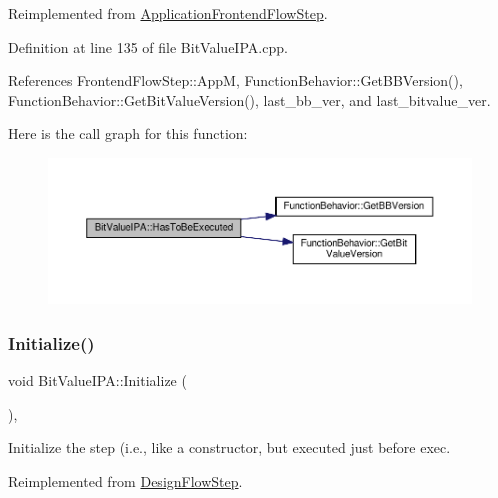 Reimplemented from \hyperlink{classApplicationFrontendFlowStep_ad99f4dcbab470c65eea79ae0291a4bd5}{Application\+Frontend\+Flow\+Step}.



Definition at line 135 of file Bit\+Value\+I\+P\+A.\+cpp.



References Frontend\+Flow\+Step\+::\+AppM, Function\+Behavior\+::\+Get\+B\+B\+Version(), Function\+Behavior\+::\+Get\+Bit\+Value\+Version(), last\+\_\+bb\+\_\+ver, and last\+\_\+bitvalue\+\_\+ver.

Here is the call graph for this function\+:
\nopagebreak
\begin{figure}[H]
\begin{center}
\leavevmode
\includegraphics[width=350pt]{da/d6c/classBitValueIPA_aaf4e7bb4cee74b03ae5e8fd94e593f2d_cgraph}
\end{center}
\end{figure}
\mbox{\label{classBitValueIPA_a00d93654fdcf33acbd281faa1915dbbd}} 
\subsubsection{\texorpdfstring{Initialize()}{Initialize()}}
{\footnotesize\ttfamily void Bit\+Value\+I\+P\+A\+::\+Initialize (\begin{DoxyParamCaption}{ }\end{DoxyParamCaption})\hspace{0.3cm}{\ttfamily [override]}, {\ttfamily [virtual]}}



Initialize the step (i.\+e., like a constructor, but executed just before exec. 



Reimplemented from \hyperlink{classDesignFlowStep_a44b50683382a094976e1d432a7784799}{Design\+Flow\+Step}.



